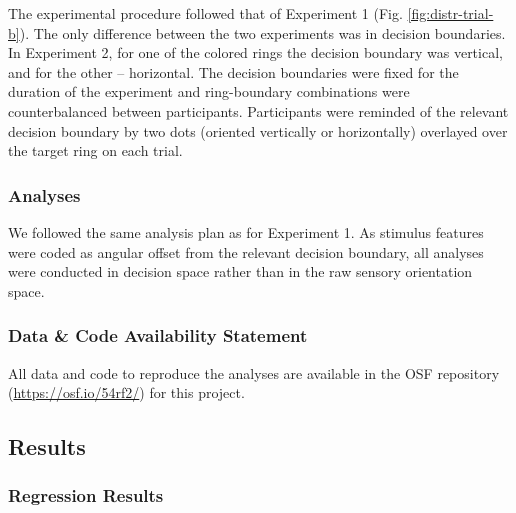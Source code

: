\documentclass[a4paper, nobind]{templates/ociamthesis}
\begin{document}
The experimental procedure followed that of Experiment 1 (Fig. \ref{fig:distr-trial-b}). The only difference between the two experiments was in decision boundaries. In Experiment 2, for one of the colored rings the decision boundary was vertical, and for the other -- horizontal. The decision boundaries were fixed for the duration of the experiment and ring-boundary combinations were counterbalanced between participants. Participants were reminded of the relevant decision boundary by two dots (oriented vertically or horizontally) overlayed over the target ring on each trial.

\hypertarget{analyses-2}{%
\subsubsection{Analyses}\label{analyses-2}}

We followed the same analysis plan as for Experiment 1. As stimulus features were coded as angular offset from the relevant decision boundary, all analyses were conducted in decision space rather than in the raw sensory orientation space.

\hypertarget{data-code-availability-statement-2}{%
\subsubsection{Data \& Code Availability Statement}\label{data-code-availability-statement-2}}

All data and code to reproduce the analyses are available in the OSF repository (\url{https://osf.io/54rf2/}) for this project.

\hypertarget{results-4}{%
\subsection{Results}\label{results-4}}

\hypertarget{regression-results-1}{%
\subsubsection{Regression Results}\label{regression-results-1}}
\end{document}
